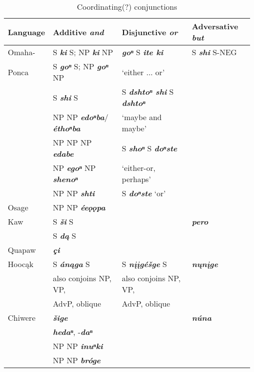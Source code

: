 \documentclass[output=paper]{LSP/langsci}
\begin{document}
\begin{table}
\caption{Coordinating(?) conjunctions} \label{coord}
\small
\begin{tabular}{ l  l  l  l  }
\lsptoprule
Language & Additive \textbf{\textit{and}} & Disjunctive \textbf{\textit{or}} & Adversative \textbf{\textit{but}} \\
\midrule
Omaha- & S \textbf{\textit{ki}} S; NP \textbf{\textit{ki}} NP & \textbf{\textit{goⁿ}}  S \textbf{\textit{ite ki}} &  S \textbf{\textit{shi}} S-NEG \\
Ponca & S \textbf{\textit{goⁿ}} S; NP \textbf{\textit{goⁿ}} NP & `either ... or' & \\
& S \textbf{\textit{shi}} S & S  \textbf{\textit{dshtoⁿ shi}}  S \textbf{\textit{dshtoⁿ}} & \\
& NP NP \textbf{\textit{edoⁿba}}/ \textbf{\textit{\'ethoⁿba}} & `maybe and maybe' & \\
& NP NP NP \textbf{\textit{edabe}} & S \textbf{\textit{shoⁿ}} S \textbf{\textit{doⁿste}} & \\
& NP \textbf{\textit{egoⁿ}} NP \textbf{\textit{shenoⁿ}} & `either-or, perhaps' & \\ \vspace{1em}

& NP NP \textbf{\textit{shti}} & S \textbf{\textit{doⁿste}} `or' &  \\  \vspace{1em}
Osage	& NP NP \textbf{\textit{\'ee\textipa{D}\k{o}\k{o}pa}} &   &   \\ 

Kaw & S \textbf{\textit{\v{s}i}} S &   & \textbf{\textit{pero}} \\  \vspace{1em}
& S \textbf{\textit{d\k{a}}} S & & \\  \vspace{1em}

Quapaw & \textbf{\textit{\c{c}i}} &   &   \\

Hooc\k{a}k & S \textbf{\textit{\'an\k{a}ga}} S & S \textbf{\textit{n\k{i}\k{i}g\'e\v{s}ge}} S & \textbf{\textit{n\k{u}n\k{i}ge}} \\
& also conjoins NP, VP,  & also conjoins NP, VP, & \\  \vspace{1em}
& AdvP, oblique & AdvP, oblique & \\

Chiwere & \textbf{\textit{\v{s}ige}} & & \textbf{\textit{n\'una}} \\
& \textbf{\textit{hedaⁿ}}, -\textbf{\textit{daⁿ}} & & \\
& NP NP \textbf{\textit{inuⁿki}} & & \\  \vspace{1em}
& NP NP \textbf{\textit{br\'oge}} & & \\


\end{tabular}
\end{table}
\end{document}
